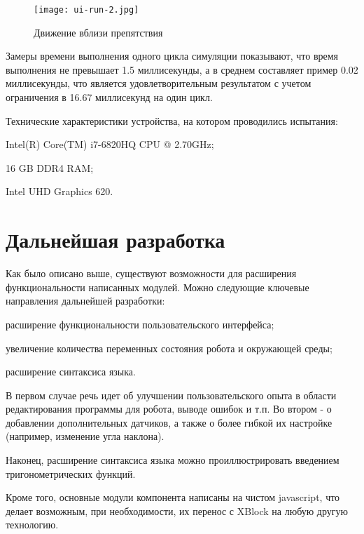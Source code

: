 \begin{figure}[htbp]
	\centering
	\texttt{[image: ui-run-2.jpg]}
	\caption{Движение вблизи препятствия}%
	\label{fig:ui-run-2}
\end{figure}

Замеры времени выполнения одного цикла симуляции показывают, что время выполнения не превышает 1.5 миллисекунды, а в среднем составляет пример 0.02 миллисекунды, что является удовлетворительным результатом с учетом ограничения в 16.67 миллисекунд на один цикл. 

Технические характеристики устройства, на котором проводились испытания:

\begin{itemize*}
	\item Intel(R) Core(TM) i7-6820HQ CPU @ 2.70GHz;
	\item 16 GB DDR4 RAM;
	\item Intel UHD Graphics 620.
\end{itemize*}

\section{Дальнейшая разработка}

Как было описано выше, существуют возможности для расширения функциональности написанных модулей. Можно следующие ключевые направления дальнейшей разработки:

\begin{itemize*}
	\item расширение функциональности пользовательского интерфейса;
	\item увеличение количества переменных состояния робота и окружающей среды;
	\item расширение синтаксиса языка.
\end{itemize*}

В первом случае речь идет об улучшении пользовательского опыта в области редактирования программы для робота, выводе ошибок и т.п. Во втором - о добавлении дополнительных датчиков, а также о более гибкой их настройке (например, изменение угла наклона).

Наконец, расширение синтаксиса языка можно проиллюстрировать введением тригонометрических функций.

Кроме того, основные модули компонента написаны на чистом javascript, что делает возможным, при необходимости, их перенос с XBlock на любую другую технологию.


